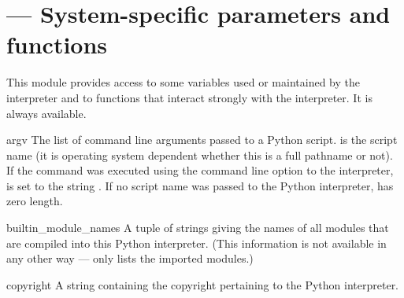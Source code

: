 \section{ ---
         System-specific parameters and functions}


This module provides access to some variables used or maintained by the
interpreter and to functions that interact strongly with the interpreter.
It is always available.


\begin{datadesc}{argv}
  The list of command line arguments passed to a Python script.
   is the script name (it is operating system
  dependent whether this is a full pathname or not).
  If the command was executed using the  command line option
  to the interpreter,  is set to the string
  .
  If no script name was passed to the Python interpreter,
   has zero length.
\end{datadesc}

\begin{datadesc}{builtin_module_names}
  A tuple of strings giving the names of all modules that are compiled
  into this Python interpreter.  (This information is not available in
  any other way ---  only lists the imported
  modules.)
\end{datadesc}

\begin{datadesc}{copyright}
A string containing the copyright pertaining to the Python interpreter.
\end{datadesc}

